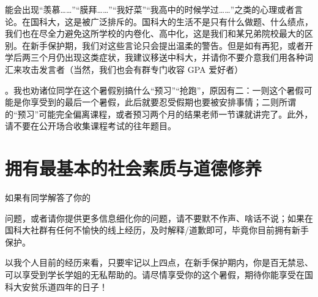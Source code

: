 能会出现“羡慕……”“膜拜……”“我好菜”“我高中的时候学过……”之类的心理或者言论。在国科大，这是被广泛排斥的。国科大的生活不是只有什么做题、什么绩点，我们也在尽全力避免这所学校的内卷化、高中化，这是我们和某兄弟院校最大的区别。在新手保护期，我们对这些言论只会提出温柔的警告。但是如有再犯，或者开学后两三个月仍出现这类症状，我建议移送中科大，并请你不要介意我们用各种词汇来攻击发言者（当然，我们也会有群专门收容 GPA 爱好者）

。我也劝诸位同学在这个暑假别搞什么“预习”“抢跑”，原因有二：一则这个暑假可能是你享受到的最后一个暑假，此后就要忍受假期也要被安排事情；二则所谓的“预习”可能完全偏离课程，或者预习两个月的结果老师一节课就讲完了。此外，请不要在公开场合收集课程考试的往年题目。

\section{拥有最基本的社会素质与道德修养}

如果有同学解答了你的

问题，或者请你提供更多信息细化你的问题，请不要默不作声、啥话不说；如果在国科大社群有任何不愉快的线上经历，及时解释/道歉即可，毕竟你目前拥有新手保护。

以我个人目前的经历来看，只要牢记以上四点，在新手保护期内，你是百无禁忌、可以享受到学长学姐的无私帮助的。请尽情享受你的这个暑假，期待你能享受在国科大安贫乐道四年的日子！
